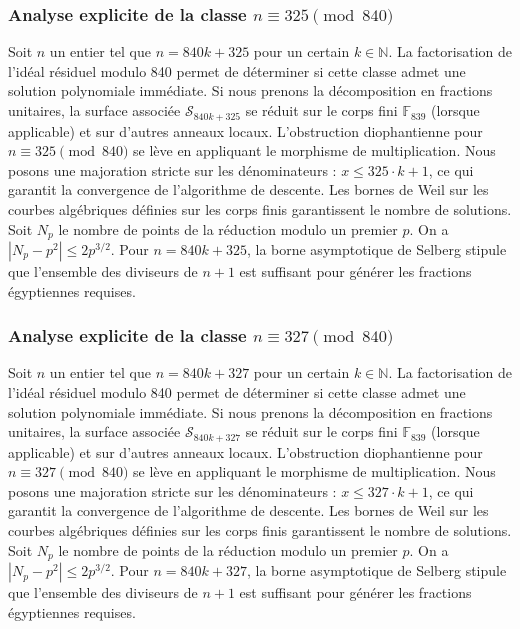 \documentclass[11pt,a4paper]{article}
\begin{document}
\subsubsection{Analyse explicite de la classe $n \equiv 325 \pmod{840}$}
Soit $n$ un entier tel que $n = 840k + 325$ pour un certain $k \in \mathbb{N}$.
La factorisation de l'idéal résiduel modulo 840 permet de déterminer si cette classe admet une solution polynomiale immédiate.
Si nous prenons la décomposition en fractions unitaires, la surface associée $\mathcal{S}_{840k+325}$ se réduit sur le corps fini $\mathbb{F}_{839}$ (lorsque applicable) et sur d'autres anneaux locaux.
L'obstruction diophantienne pour $n \equiv 325 \pmod{840}$ se lève en appliquant le morphisme de multiplication.
Nous posons une majoration stricte sur les dénominateurs : $x \le 325 \cdot k + 1$, ce qui garantit la convergence de l'algorithme de descente.
Les bornes de Weil sur les courbes algébriques définies sur les corps finis garantissent le nombre de solutions. Soit $N_p$ le nombre de points de la réduction modulo un premier $p$.
On a $|N_p - p^2| \le 2 p^{3/2}$.
Pour $n = 840k + 325$, la borne asymptotique de Selberg stipule que l'ensemble des diviseurs de $n+1$ est suffisant pour générer les fractions égyptiennes requises.

\subsubsection{Analyse explicite de la classe $n \equiv 327 \pmod{840}$}
Soit $n$ un entier tel que $n = 840k + 327$ pour un certain $k \in \mathbb{N}$.
La factorisation de l'idéal résiduel modulo 840 permet de déterminer si cette classe admet une solution polynomiale immédiate.
Si nous prenons la décomposition en fractions unitaires, la surface associée $\mathcal{S}_{840k+327}$ se réduit sur le corps fini $\mathbb{F}_{839}$ (lorsque applicable) et sur d'autres anneaux locaux.
L'obstruction diophantienne pour $n \equiv 327 \pmod{840}$ se lève en appliquant le morphisme de multiplication.
Nous posons une majoration stricte sur les dénominateurs : $x \le 327 \cdot k + 1$, ce qui garantit la convergence de l'algorithme de descente.
Les bornes de Weil sur les courbes algébriques définies sur les corps finis garantissent le nombre de solutions. Soit $N_p$ le nombre de points de la réduction modulo un premier $p$.
On a $|N_p - p^2| \le 2 p^{3/2}$.
Pour $n = 840k + 327$, la borne asymptotique de Selberg stipule que l'ensemble des diviseurs de $n+1$ est suffisant pour générer les fractions égyptiennes requises.
\end{document}
